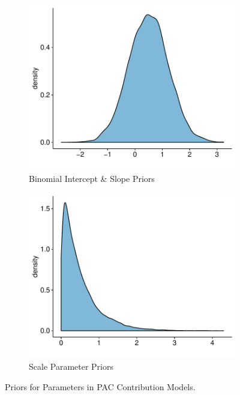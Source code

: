 \documentclass[12pt]{article}
\begin{document}
\begin{appendices}
\begin{figure}[!htb]
\begin{subfigure}[b]{0.45\textwidth}
        \includegraphics[width=\linewidth]{pac_logit.pdf}
        \caption{Binomial Intercept \& Slope Priors}
    \end{subfigure}
    \begin{subfigure}[b]{0.45\textwidth}
    	\centering
        \includegraphics[width=\linewidth]{pac_scale.pdf}
        \caption{Scale Parameter Priors}
    \end{subfigure}
    \caption{Priors for Parameters in PAC Contribution Models.}
    \label{fig: priors}
\end{figure}


\end{appendices}
\end{document}
